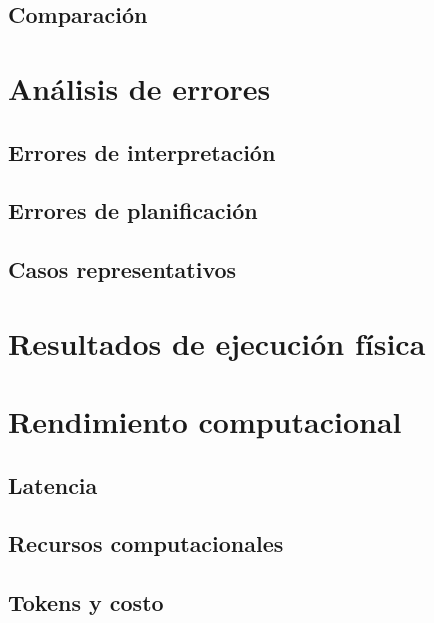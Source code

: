 \subsection{Comparación}


\section{Análisis de errores}

\subsection{Errores de interpretación}

\subsection{Errores de planificación}

\subsection{Casos representativos}


\section{Resultados de ejecución física}


\section{Rendimiento computacional}

\subsection{Latencia}

\subsection{Recursos computacionales}

\subsection{Tokens y costo}